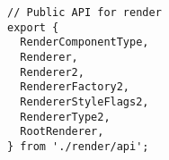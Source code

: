 \begin{verbatim}
// Public API for render
export {
  RenderComponentType,
  Renderer,
  Renderer2,
  RendererFactory2,
  RendererStyleFlags2,
  RendererType2,
  RootRenderer,
} from './render/api';
\end{verbatim}
